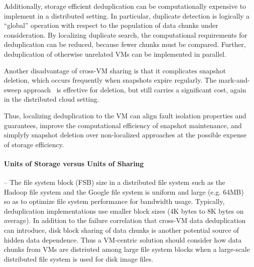 Additionally, storage efficient deduplication can be computationally expensive
to implement in a distributed setting.  In particular, duplicate detection is
logically a ``global'' operation with respect to the population of data chunks
under consideration.
By localizing duplicate search, the computational requirements
for deduplication can be reduced, because fewer chunks must be compared.
Further, deduplication of otherwise unrelated VMs can be implemented in
parallel.
 
Another disadvantage of cross-VM sharing is that it complicates 
snapshot deletion, 
which occurs frequently when snapshots expire regularly. 
The mark-and-sweep approach~\cite{Guo2011,Fabiano2013}  is effective for
deletion, but still carries a significant cost, again in the distributed cloud
setting.

Thus,
localizing deduplication to the VM can align fault isolation properties and
guarantees, improve the computational efficiency of snapshot maintenance, and
simplyfy snapshot deletion over non-localized approaches at the possible
expense of storage efficiency.

\paragraph*{Units of Storage versus Units of Sharing} --
The file system block (FSB) size in a distributed file system such as  
the Hadoop file system and the Google file system
is uniform and large (e.g.  64MB) so as to optimize file system performance
for bandwidth usage.
Typically, deduplication implementations use smaller block sizes (4K bytes to
8K bytes on average).
In addition to the failure correlation that cross-VM data deduplication can
introduce, disk block sharing of data chunks is another potential source of
hidden data dependence.
Thus a VM-centric solution should consider how data chunks from VMs are
distriuted among large file system blocks when a large-scale distributed file
system is used for disk image files.

 

